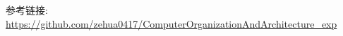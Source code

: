 \documentclass[AutoFakeBold]{LZUThesis}
\begin{document}



\Appendix
参考链接:
\url{https://github.com/zehua0417/ComputerOrganizationAndArchitecture_exp}



\end{document}
